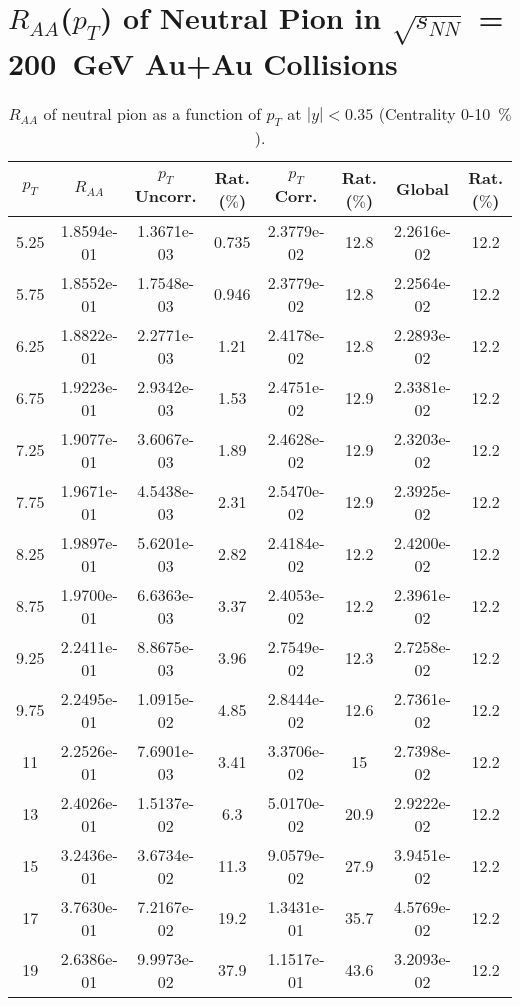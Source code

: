 \chapter{$R_{AA}$($p_{T}$) of Neutral Pion in $\sqrt{s_{NN}}$ = 200~GeV Au+Au Collisions}
\begin{table}[!htb]
\centering
\begin{tabular}{|c|c|c|c|c|c|c|c|}
\hline
$p_{T}$ & $R_{AA}$ & $p_{T}$ Uncorr. & Rat. ($\%$) & $p_{T}$ Corr. & Rat. ($\%$) & Global & Rat. ($\%$)\\
\hline
5.25 & 1.8594e-01 & 1.3671e-03 & 0.735 & 2.3779e-02 & 12.8 & 2.2616e-02 & 12.2 \\ 
5.75 & 1.8552e-01 & 1.7548e-03 & 0.946 & 2.3779e-02 & 12.8 & 2.2564e-02 & 12.2 \\ 
6.25 & 1.8822e-01 & 2.2771e-03 & 1.21 & 2.4178e-02 & 12.8 & 2.2893e-02 & 12.2 \\ 
6.75 & 1.9223e-01 & 2.9342e-03 & 1.53 & 2.4751e-02 & 12.9 & 2.3381e-02 & 12.2 \\ 
7.25 & 1.9077e-01 & 3.6067e-03 & 1.89 & 2.4628e-02 & 12.9 & 2.3203e-02 & 12.2 \\ 
7.75 & 1.9671e-01 & 4.5438e-03 & 2.31 & 2.5470e-02 & 12.9 & 2.3925e-02 & 12.2 \\ 
8.25 & 1.9897e-01 & 5.6201e-03 & 2.82 & 2.4184e-02 & 12.2 & 2.4200e-02 & 12.2 \\ 
8.75 & 1.9700e-01 & 6.6363e-03 & 3.37 & 2.4053e-02 & 12.2 & 2.3961e-02 & 12.2 \\ 
9.25 & 2.2411e-01 & 8.8675e-03 & 3.96 & 2.7549e-02 & 12.3 & 2.7258e-02 & 12.2 \\ 
9.75 & 2.2495e-01 & 1.0915e-02 & 4.85 & 2.8444e-02 & 12.6 & 2.7361e-02 & 12.2 \\ 
11 & 2.2526e-01 & 7.6901e-03 & 3.41 & 3.3706e-02 & 15 & 2.7398e-02 & 12.2 \\ 
13 & 2.4026e-01 & 1.5137e-02 & 6.3 & 5.0170e-02 & 20.9 & 2.9222e-02 & 12.2 \\ 
15 & 3.2436e-01 & 3.6734e-02 & 11.3 & 9.0579e-02 & 27.9 & 3.9451e-02 & 12.2 \\ 
17 & 3.7630e-01 & 7.2167e-02 & 19.2 & 1.3431e-01 & 35.7 & 4.5769e-02 & 12.2 \\ 
19 & 2.6386e-01 & 9.9973e-02 & 37.9 & 1.1517e-01 & 43.6 & 3.2093e-02 & 12.2 \\ 
\hline
\end{tabular}
\caption{$R_{AA}$ of neutral pion as a function of $p_{T}$ at $|y|<0.35$ (Centrality 0-10~$\%$).}
\end{table}
            

